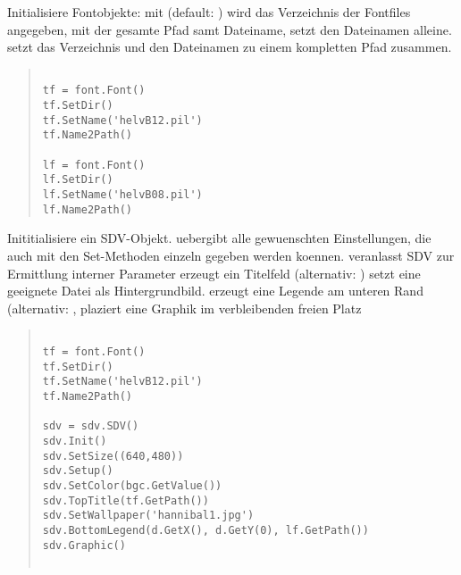Initialisiere Fontobjekte: mit  (default:
) wird das Verzeichnis der Fontfiles angegeben, mit
 der gesamte Pfad samt Dateiname,
 setzt den Dateinamen alleine.
 setzt das Verzeichnis und den Dateinamen zu
einem kompletten Pfad zusammen.

\begin{small}
\begin{quote}
\begin{verbatim}

tf = font.Font()          
tf.SetDir()               
tf.SetName('helvB12.pil') 
tf.Name2Path()            
                          
lf = font.Font()          
lf.SetDir()
lf.SetName('helvB08.pil')
lf.Name2Path()

\end{verbatim}
\end{quote}
\end{small}

Inititialisiere ein SDV-Objekt.   uebergibt alle
gewuenschten Einstellungen, die auch mit den Set-Methoden einzeln
gegeben werden koennen.   veranlasst SDV zur
Ermittlung interner Parameter  erzeugt ein
Titelfeld (alternativ: )
 setzt eine geeignete Datei als
Hintergrundbild.   erzeugt eine Legende am
unteren Rand (alternativ: ,
  plaziert eine Graphik
im verbleibenden freien Platz

\begin{small}
\begin{quote}
\begin{verbatim}

tf = font.Font()          
tf.SetDir()               
tf.SetName('helvB12.pil') 
tf.Name2Path()            

sdv = sdv.SDV()                    
sdv.Init()                         
sdv.SetSize((640,480))             
sdv.Setup()                        
sdv.SetColor(bgc.GetValue())       
sdv.TopTitle(tf.GetPath())
sdv.SetWallpaper('hannibal1.jpg')
sdv.BottomLegend(d.GetX(), d.GetY(0), lf.GetPath())  
sdv.Graphic()                                        
                                                     
\end{verbatim}
\end{quote}
\end{small}

